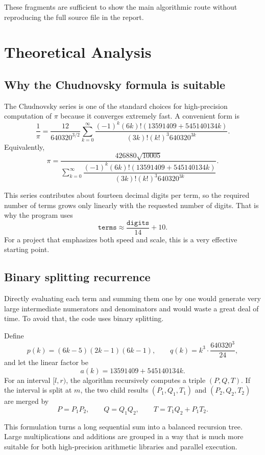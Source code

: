 \documentclass[12pt,a4paper]{article}
\begin{document}
These fragments are sufficient to show the main algorithmic route without reproducing the full source file in the report.

\section{Theoretical Analysis}

\subsection{Why the Chudnovsky formula is suitable}

The Chudnovsky series is one of the standard choices for high-precision computation of $\pi$ because it converges extremely fast. A convenient form is
\[
\frac{1}{\pi}
=
\frac{12}{640320^{3/2}}
\sum_{k=0}^{\infty}
\frac{(-1)^k (6k)!\left(13591409 + 545140134k\right)}
{(3k)!(k!)^3 640320^{3k}}.
\]
Equivalently,
\[
\pi
=
\frac{426880\sqrt{10005}}
{\sum_{k=0}^{\infty}
\dfrac{(-1)^k (6k)!\left(13591409 + 545140134k\right)}
{(3k)!(k!)^3 640320^{3k}} }.
\]

This series contributes about fourteen decimal digits per term, so the required number of terms grows only linearly with the requested number of digits. That is why the program uses
\[
\texttt{terms} \approx \frac{\texttt{digits}}{14} + 10.
\]
For a project that emphasizes both speed and scale, this is a very effective starting point.

\subsection{Binary splitting recurrence}

Directly evaluating each term and summing them one by one would generate very large intermediate numerators and denominators and would waste a great deal of time. To avoid that, the code uses binary splitting.

Define
\[
p(k) = (6k-5)(2k-1)(6k-1),
\qquad
q(k) = k^3\cdot \frac{640320^3}{24},
\]
and let the linear factor be
\[
a(k) = 13591409 + 545140134k.
\]
For an interval $[l,r)$, the algorithm recursively computes a triple $(P,Q,T)$. If the interval is split at $m$, the two child results $(P_1,Q_1,T_1)$ and $(P_2,Q_2,T_2)$ are merged by
\[
P = P_1P_2,
\qquad
Q = Q_1Q_2,
\qquad
T = T_1Q_2 + P_1T_2.
\]

This formulation turns a long sequential sum into a balanced recursion tree. Large multiplications and additions are grouped in a way that is much more suitable for both high-precision arithmetic libraries and parallel execution.
\end{document}
